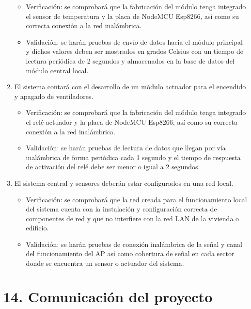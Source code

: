 \documentclass[11pt]{charter}
\begin{document}
\begin{enumerate}
\begin{itemize}
\item Verificación: se comprobará que la fabricación del módulo tenga integrado el sensor de temperatura y la placa de NodeMCU Esp8266, así como su correcta conexión a la red inalámbrica. 
\item Validación: se harán pruebas de envío de datos hacia el módulo principal y dichos valores deben ser mostrados en grados Celsius con un tiempo de lectura periódica de 2 segundos y almacenados en la base de datos del módulo central local.  
\end{itemize}


\item El sistema contará con el desarrollo de un módulo actuador para el encendido y apagado de ventiladores.

\begin{itemize}
\item Verificación: se comprobará que la fabricación del módulo tenga integrado el relé actuador y la placa de NodeMCU Esp8266, así como su correcta conexión a la red inalámbrica.
\item Validación: se harán pruebas de lectura de datos que llegan por vía inalámbrica de forma periódica cada 1 segundo y el tiempo de respuesta de activación del relé debe ser menor o igual a 2 segundos.  
\end{itemize}

\item El sistema central y sensores deberán estar configurados en una red local.

\begin{itemize}
\item Verificación: se comprobará que la red creada para el funcionamiento local del sistema cuenta con la instalación y configuración correcta de componentes de red y que no interfiere con la red LAN de la vivienda o edificio. 
\item Validación: se harán pruebas de conexión inalámbrica de la señal y canal del funcionamiento del AP así como cobertura de señal en cada sector donde se encuentra un sensor o actuador del sistema. 
\end{itemize}

\end{enumerate}

\section{14. Comunicación del proyecto}
\label{sec:comunicaciones}
\end{document}
